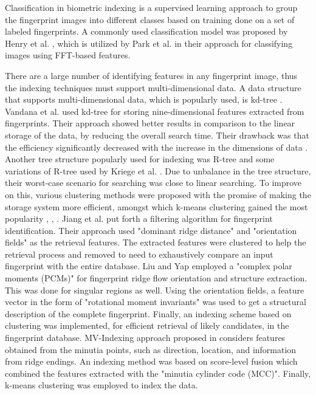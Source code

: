 Classification in biometric indexing is a supervised learning approach to group the fingerprint images
into different classes based on training done on a set of labeled fingerprints.
A commonly used classification model was proposed by Henry et al. \cite{henry1922classification}, which
is utilized by Park et al. \cite{park2005} in their approach for classifying images using FFT-based features.

There are a large number of identifying features in any fingerprint image, 
thus the indexing techniques must support multi-dimensional data. 
A data structure that supports multi-dimensional data, which is popularly used, is kd-tree \cite{bently1975}.
Vandana et al. \cite{vandana2008} used kd-tree for storing nine-dimensional features extracted from fingerprints. 
 Their approach showed better results in comparison to the linear storage of the data, 
 by reducing the overall search time. 
 Their drawback was that the efficiency significantly decreased with the increase in the dimensions of data \cite{Otair2013}. 
 Another tree structure popularly used for indexing was R-tree
and some variations of R-tree used by Kriege et al. \cite{Kriegel1990}. 
Due to unbalance in the tree structure, their worst-case scenario for searching was close to linear searching.
To improve on this, various clustering methods were
proposed with the promise of making the storage system more efficient, amongst which k-means
clustering gained the most popularity \cite{Jiang2006}, \cite{liu2012}, \cite{Li2014}.
Jiang et al. \cite{Jiang2006} put forth a filtering algorithm for fingerprint identification. 
Their approach used "dominant ridge distance" and "orientation fields" as the retrieval features.
The extracted features were clustered to help the retrieval process 
and removed to need to exhaustively compare an input fingerprint with the entire database.
Liu and Yap \cite{liu2012} employed a "complex polar moments (PCMs)" for fingerprint ridge flow orientation and structure extraction.
This was done for singular regions as well. 
Using the orientation fields, a feature vector in the form of "rotational moment invariants" was used
to get a structural description of the complete fingerprint.
Finally, an indexing scheme based on clustering was implemented, for efficient retrieval of likely candidates, 
in the fingerprint database.
MV-Indexing approach proposed in \cite{Li2014} considers features obtained from the minutia
points, such as direction, location, and information from ridge endings. 
An indexing method was based on score-level fusion which combined the features extracted with the "minutia
cylinder code (MCC)". Finally, k-means clustering was employed to index the data.

